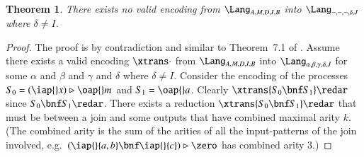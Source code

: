 \documentclass[submission,copyright,creativecommons]{eptcs}
\newtheorem{theorem}{Theorem}[section]
\newcommand{\join}[1]{(#1)\rhd }
\begin{document}
\begin{theorem}
\label{thm:no_int_2_join}
There exists no valid encoding from $\Lang_{A,M,D,I,B}$ into $\Lang_{-,-,-,\delta,J}$ where $\delta\neq I$.
\end{theorem}
\begin{proof}
The proof is by contradiction and similar to Theorem~7.1 of \cite{givenwilson:hal-01026301}.
Assume there exists a valid encoding $\xtrans\cdot$ from $\Lang_{A,M,D,I,B}$ into
$\Lang_{\alpha,\beta,\gamma,\delta,J}$ for some $\alpha$ and $\beta$ and $\gamma$ and $\delta$
where $\delta\neq I$.
Consider the encoding of the processes $S_0=\join{\iap {} x} \oap {} m$ and $S_1=\oap {} a$.
Clearly $\xtrans{S_0 \bnf S_1}\redar$  since $S_0\bnf S_1\redar$.
There exists a reduction $\xtrans{S_0\bnf S_1}\redar$ that must be between a
join and some outputs that have combined maximal arity $k$.
(The combined arity is the sum of the arities of all the input-patterns of the join involved,
e.g.~$\join{\iap {} {a,b}\bnf\iap {} {c}} \zero$ has combined arity 3.)


\end{proof}
\end{document}
